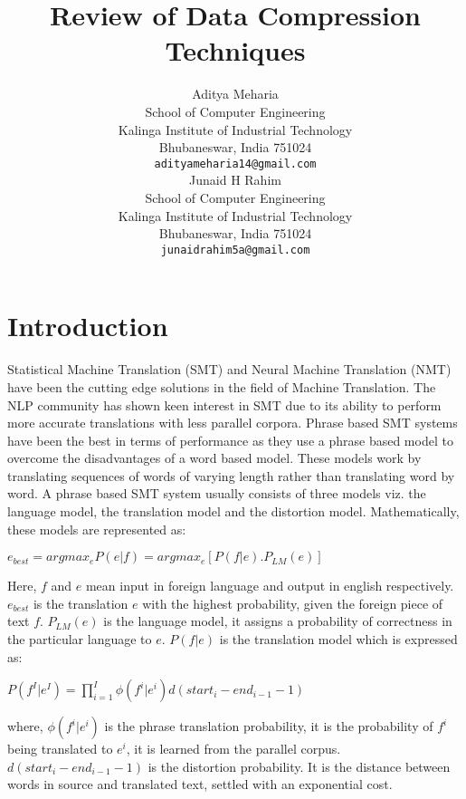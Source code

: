 \documentclass{article}
\title{Review of Data Compression Techniques}
\author{
	Aditya Meharia\\
	School of Computer Engineering\\
	Kalinga Institute of Industrial Technology\\
	Bhubaneswar, India 751024 \\
	\texttt{adityameharia14@gmail.com} \\
	\And
   	Junaid H Rahim\\
	School of Computer Engineering\\
	Kalinga Institute of Industrial Technology\\
	Bhubaneswar, India 751024 \\
	\texttt{junaidrahim5a@gmail.com} \\	
}
\begin{document}
\maketitle

\begin{abstract}
\lipsum[1]
\lipsum[2]
\lipsum[2]
\lipsum[2]
\end{abstract}




\section{Introduction}

Statistical Machine Translation (SMT) and Neural Machine Translation (NMT) have been the cutting edge solutions in the field of Machine Translation. The NLP community has shown keen interest in SMT due to its ability to perform more accurate translations with less parallel corpora. Phrase based SMT systems have been the best in terms of performance as they use a phrase based model to overcome the disadvantages of a word based model. These models work by translating sequences of words of varying length rather than  translating word by word. A phrase based SMT system usually consists of three models viz. the language model, the translation model and the distortion model. Mathematically, these models are represented as: \\

\begin{center}
$ e_{best} = argmax_{e} P(e|f) = argmax_{e} [P(f|e).P_{LM}(e)] $ \\
\end{center}

Here, $f$ and $e$ mean input in foreign language and output in english respectively. $e_{best}$ is the translation $e$ with the highest probability, given the foreign piece of text $f$. $P_{LM}(e)$ is the language model, it assigns a probability of correctness in the particular language to $e$. $P(f|e)$ is the translation model which is expressed as: \\

\begin{center}
$ P(f^{I}|e^{I}) = \displaystyle\prod_{i=1}^{I} \phi(f^{i}|e^{i})d(start_{i} - end_{i-1} - 1) $ \\
\end{center}

where, $\phi(f^{i}|e^{i})$ is the phrase translation probability, it is the probability of $f^{i}$ being translated to $e^{i}$, it is learned from the parallel corpus. $d(start_{i} - end_{i-1} - 1)$ is the distortion probability. It is the distance between words in source and translated text, settled with an exponential cost.
\end{document}
